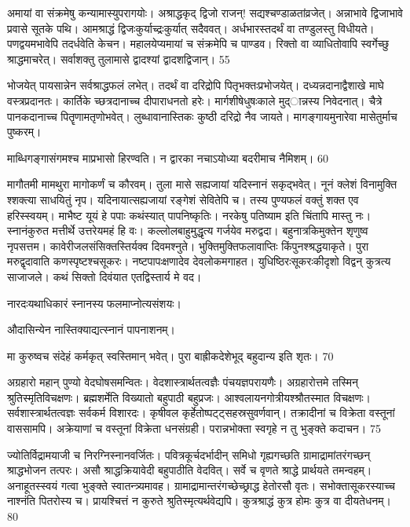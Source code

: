 अमायां वा संक्रमेषु कन्यामास्युपरागयोः।
अश्राद्धकृद् द्विजो राजन्! सद्यश्चण्डाळतांव्रजेत्।
अन्नाभावे द्विजाभावे प्रवासे सूतके पथि।
आमश्राद्धं द्विजःकुर्याच्द्रःकुर्यात् सदैववत्।
अर्धभारस्तदर्थं वा तण्डुलस्तु विधीयते।
पणद्वयमभावेपि तदर्धवेति केचन।
महालयेप्यमायां च संक्रमेपि च पाण्डव।
रिक्तो वा व्याधितोवापि स्वर्गेच्छु श्राद्धमाचरेत्।
सर्वाशक्तु तुलामासे द्वादश्यां द्वादशद्विजान्।
55

भोजयेत् पायसान्नेन सर्वश्राद्धफलं लभेत्।
तदर्थं वा दरिद्रोपि पितृभक्तःप्रभोजयेत्।
दध्यन्नदानाद्वैशाखे माघे वस्त्रप्रदानतः।
कार्तिके च्छत्रदानाच्च दीपाराधनतो हरेः।
मार्गशीषेधुषःकाले मुद्ान्नस्य निवेदनात्।
चैत्रे पानकदानाच्च पितॄणामतृणोभवेत्।
लुब्धावानास्तिकः कुष्ठी दरिद्रो नैव जायते।
मागङ्गायमुनारेवा मासेतुर्माच पुष्करम्।

माब्धिगङ्गासंगमश्च माप्रभासो हिरण्वति।
न द्वारका नचाऽयोध्या बदरीमाच नैमिशम्।
60

मागौतमी मामथुरा मागोकर्णं च कौरवम्।
तुला मासे सह्यजायां यदिस्नानं सकृद्भवेत्।
नूनं क्लेशं विनामुक्ति श्शक्त्या साधयितुं नृप।
यदिनायात्सह्यजायां रङ्गेशं सेवितेपि च।
तस्य पुण्यफलं वक्तुं शक्त एव हरिस्स्वयम्।
माभैष्ट यूयं हे पपाः कथंस्यात् पापनिष्कृतिः।
नरकेषु पतिष्याम इति चिंतापि मास्तु नः।
स्नानंकुरुत मत्तीर्थे उत्तरेयमहं हि वः।
कल्लोलबाहुमुद्धृत्य गर्जयेव मरुद्वदा।
बहुनात्रकिमुक्तेन शृणुष्व नृपसत्तम।
कावेरीजलसंसिक्तस्तिर्यक्व दिवमश्नुते।
भुक्तिमुक्तिफलावाप्तिः किंपुनश्श्रद्धयाकृते।
पुरा मरुद्वृदावाति कणस्पृष्टश्चसूकरः।
नष्टपापःक्षणादेव देवलोकमगाहत।
युधिष्ठिरःसूकरःकीदृशो विद्वन् कुत्रत्य साजाजले।
कथं सिक्तो दिवंयात एतद्विस्तार्य मे वद।

नारदःयथाधिकारं स्नानस्य फलमाप्नोत्यसंशयः।

औदासिन्येन नास्तिक्याद्यत्स्नानं पापनाशनम्।

मा कुरुष्वच संदेहं कर्मकृत् स्वस्तिमान् भवेत्।
पुरा बाह्रीकदेशेभूद् बहुदान्य इति शृतः।
70

अग्रहारो महान् पुण्यो वेदघोषसमन्वितः।
वेदशास्त्रार्थतत्वज्ञैः पंचयज्ञपरायणैः।
अग्रहारोत्तमे तस्मिन् श्रुतिस्मृतिविचक्षणः।
ब्रह्मशर्मेति विख्यातो बहुपाठी बहुप्रजः।
आश्वलायनगोत्रीयश्श्रौतस्मात विचक्षणः।
सर्वशास्त्रार्थतत्वज्ञः सर्वकर्म विशारदः।
कृषीवल कृर्हेतोष्पट्ट्सहस्रसुवर्णवान्।
तक्रादीनां च विक्रेता वस्तूनां वाससामपि।
अक्रेयाणां च वस्तूनां विक्रेता धनसंग्रही।
परान्नभोक्ता स्वगृहे न तु भुङ्क्ते कदाचन।
75

ज्योतिर्विद्रामयाजी च निरग्निस्नानवर्जितः।
पवित्रकूर्चदर्भादीन् समिधो गृह्यगच्छति ग्रामाद्रामांतरंगच्छन् श्राद्धभोजन तत्परः।
असौ श्राद्धक्रियावेदी बहुपाठीति वेदवित्।
सर्वे च वृणते श्राद्धे प्रार्थयते तमन्वहम्।
अनाहूतस्स्वयं गत्वा भुङ्क्ते स्वातन्त्र्यमावह।
ग्रामाद्रामान्तरंगच्छेच्छ्राद्ध हेतोरसौ वृतः।
सभोक्तासूकरस्याच्च नाश्नंति पितरोस्य च।
प्रायश्चित्तं न कुरुते श्रुतिस्मृत्यर्थवेद्यपि।
कुत्रश्राद्धं कुत्र होमः कुत्र वा दीयतेधनम्।
80


